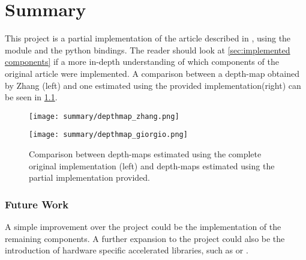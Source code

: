 
\chapter{Summary}

This project is a partial implementation of the article described in \cite{Zhang2009}, using the \Numpy{} module and the \OpenCV{} python bindings. 
The reader should look at \cref{sec:implemented components} if a more in-depth understanding of which components of the original article were implemented.
A comparison between a depth-map obtained by Zhang (left) and one estimated using the provided implementation(right) can be seen in \cref{fig:disp_comparison}.

\begin{figure}[!h]
	\centering
	\begin{minipage}[c]{.45\textwidth}
		\centering
		\texttt{[image: summary/depthmap\_zhang.png]}
	\end{minipage}
	\begin{minipage}[c]{.45\textwidth}
		\centering
		\texttt{[image: summary/depthmap\_giorgio.png]}
	\end{minipage}
\caption{Comparison between depth-maps estimated using the complete original implementation (left) and depth-maps estimated using the partial implementation provided.}\label{fig:disp_comparison}
\end{figure}

\subsection{Future Work}
A simple improvement over the project could be the implementation of the remaining components. A further expansion to the project could also be the introduction of hardware specific accelerated libraries, such as \Cupy{} or \Pytorch.
